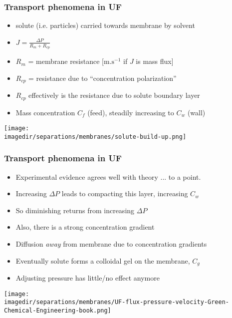 \begin{frame}\frametitle{Transport phenomena in UF}
	\begin{itemize}		
		\item	solute (i.e. particles) carried towards membrane by solvent
		\item	$J = \displaystyle\frac{\Delta P}{R_m + R_{cp}}$
		\item	$R_m$ = membrane resistance [$\text{m.s}^{-1}$ if $J$ is mass flux] 
		\item	$R_{cp}$ = resistance due to ``concentration polarization''
		\item	$R_{cp}$ effectively is the resistance due to solute boundary layer
		\item	Mass concentration $C_f$ (feed), steadily increasing to $C_w$ (wall)
	\end{itemize}
	\begin{center}
		\texttt{[image: \\imagedir/separations/membranes/solute-build-up.png]}
	\end{center}
\end{frame}

\begin{frame}\frametitle{Transport phenomena in UF}
	\begin{itemize}
		\item	Experimental evidence agrees well with theory ... to a point.
		\item	Increasing $\Delta P$ leads to compacting this layer, increasing $C_w$
		\item	So diminishing returns from increasing $\Delta P$
		\item	Also, there is a strong concentration gradient
		\item	Diffusion \emph{away} from membrane due to concentration gradients		
		\item	Eventually solute forms a colloidal gel on the membrane, $C_g$
		\item	Adjusting pressure has little/no effect anymore
	\end{itemize}
	\begin{center}
		\texttt{[image: \\imagedir/separations/membranes/UF-flux-pressure-velocity-Green-Chemical-Engineering-book.png]}
	\end{center}
	\vspace{-12pt}
\end{frame}

